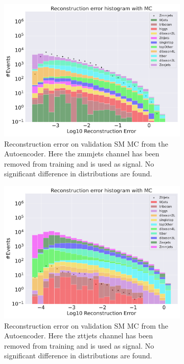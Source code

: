 \begin{figure}[h!]
    \centering
    \begin{subfigure}{.8\textwidth}
        \includegraphics[width=\textwidth]{Figures/AE_testing/small/b_data_recon_big_rm3_feats_sig_Zmmjets.pdf}
        \caption{Reconstruction error on validation SM MC from the Autoencoder. Here the zmmjets channel has been removed from training and 
        is used as signal. No significant difference in distributions are found.  }
        \label{fig:ae_small_zmmjets}
    \end{subfigure}
    \hfill
    \begin{subfigure}{.8\textwidth}
        \includegraphics[width=\textwidth]{Figures/AE_testing/small/b_data_recon_big_rm3_feats_sig_Zttjets.pdf}
        \caption{Reconstruction error on validation SM MC from the Autoencoder. Here the zttjets channel has been removed from training and 
        is used as signal. No significant difference in distributions are found. }
        \label{fig:ae_small_zttjets}
    \end{subfigure}
    \hfill        
    \caption{ }
    \label{fig:ae_small_channel6}
\end{figure}


